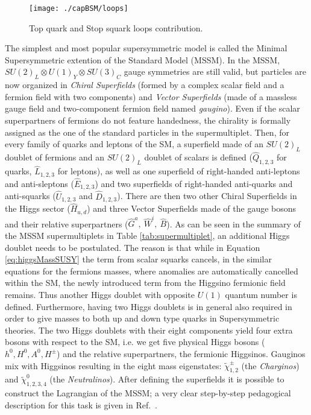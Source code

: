 \begin{figure}[htb]\begin{center}
\texttt{[image: ./capBSM/loops]}\caption{Top quark and Stop squark loops contribution.}
\label{loops}\end{center}\end{figure}

The simplest and most popular supersymmetric model is called the Minimal Supersymmetric extention of the Standard Model (MSSM). In the MSSM, $SU(2)_{L}\otimes U(1)_{Y}\otimes SU(3)_{C}$ gauge symmetries are still valid, but particles are now organized in \textit{Chiral Superfields} (formed by a complex scalar field and a fermion field with two components) and 
\textit{Vector Superfields} (made of a massless gauge field and two-component fermion field named \textit{gaugino}). Even if the scalar superpartners of fermions do not feature handedness, the chirality is formally assigned as the one of the standard particles in the supermultiplet. Then, for every family of quarks and leptons of the SM, a superfield made of an $SU(2)_{L}$ doublet of fermions and an $SU(2)_{L}$ doublet of scalars is defined ($\hat Q_{1,2,3}$ for quarks, $\hat L_{1,2,3}$ for leptons), as well as one superfield of right-handed anti-leptons and anti-sleptons ($\hat E_{1,2,3}$) and two superfields of right-handed anti-quarks and anti-squarks ($\hat U_{1,2,3}$ and $\hat D_{1,2,3}$). There are then two other Chiral Superfields in the 
Higgs sector ($\hat H_{u,d}$) and three Vector Superfields made of the gauge bosons and their relative superpartners ($\hat{G}^{a},\ \hat{W}^{i},\ \hat{B}$). 
As can be seen in the summary of the MSSM supermultiplets in Table \ref{tab:supermultiplet}, an additional Higgs doublet needs to be postulated. The reason is that while in Equation \ref{eq:higgsMassSUSY} the term from scalar squarks cancels, in the similar equations for the fermions masses, where anomalies are automatically  cancelled within the SM, the newly introduced term from the Higgsino fermionic field remains. Thus another Higgs doublet with opposite $U(1)$ quantum number is defined. Furthermore, having two Higgs doublets is in general also required in order to give masses to both up and down type quarks in Supersymmetric theories. The two Higgs doublets with their eight components yield four 
extra bosons with respect to the SM, i.e. we get five physical Higgs bosons ($h^{0}, H^{0}, A^{0}, H^{\pm}$) and the relative superpartners, the fermionic Higgsinos. Gauginos mix  with Higgsinos resulting in the eight mass eigenstates: $\tilde{\chi}^{\pm}_{1,2}$ (the \textit{Charginos}) and $\tilde{\chi}^{0}_{1,2,3,4}$ (the \textit{Neutralinos}). After defining the superfields it is possible to construct the Lagrangian of the MSSM; a very clear step-by-step  pedagogical description for this task is given in Ref.~\cite{Martin}.


